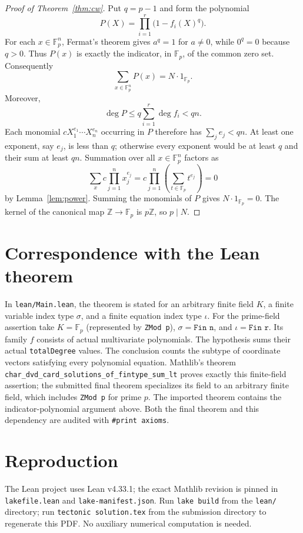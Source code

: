 \documentclass[11pt]{article}
\begin{document}
\begin{proof}[Proof of Theorem~\ref{thm:cw}]
Put $q=p-1$ and form the polynomial
\[
  P(X)=\prod_{i=1}^{r}\bigl(1-f_i(X)^q\bigr).
\]
For each $x\in\mathbb F_p^n$, Fermat's theorem gives $a^q=1$ for
$a\neq0$, while $0^q=0$ because $q>0$. Thus $P(x)$ is exactly the
indicator, in $\mathbb F_p$, of the common zero set. Consequently
\[
  \sum_{x\in\mathbb F_p^n}P(x)=N\cdot1_{\mathbb F_p}.
\]
Moreover,
\[
  \deg P\leq q\sum_{i=1}^{r}\deg f_i<qn.
\]
Each monomial $cX_1^{e_1}\cdots X_n^{e_n}$ occurring in $P$ therefore
has $\sum_j e_j<qn$. At least one exponent, say $e_j$, is less than $q$;
otherwise every exponent would be at least $q$ and their sum at least $qn$.
Summation over all $x\in\mathbb F_p^n$ factors as
\[
  \sum_x c\prod_{j=1}^{n}x_j^{e_j}
  =c\prod_{j=1}^{n}\left(\sum_{t\in\mathbb F_p}t^{e_j}\right)=0
\]
by Lemma~\ref{lem:power}. Summing the monomials of $P$ gives
$N\cdot1_{\mathbb F_p}=0$. The kernel of the canonical map
$\mathbb Z\to\mathbb F_p$ is $p\mathbb Z$, so $p\mid N$.
\end{proof}

\section*{Correspondence with the Lean theorem}
In \texttt{lean/Main.lean}, the theorem is stated for an arbitrary finite
field $K$, a finite variable index type $\sigma$, and a finite equation
index type $\iota$. For the prime-field assertion take $K=\mathbb F_p$
(represented by \texttt{ZMod p}), $\sigma=\texttt{Fin n}$, and
$\iota=\texttt{Fin r}$. Its family $f$ consists of actual multivariate
polynomials. The hypothesis sums their actual \texttt{totalDegree} values.
The conclusion counts the subtype of coordinate vectors satisfying every
polynomial equation. Mathlib's theorem
\texttt{char\_dvd\_card\_solutions\_of\_fintype\_sum\_lt} proves exactly
this finite-field assertion; the submitted final theorem specializes its
field to an arbitrary finite field, which includes \texttt{ZMod p} for
prime $p$. The imported theorem contains the indicator-polynomial argument
above. Both the final theorem and this
dependency are audited with \texttt{\#print axioms}.

\section*{Reproduction}
The Lean project uses Lean v4.33.1; the exact Mathlib revision is pinned in
\texttt{lakefile.lean} and \texttt{lake-manifest.json}. Run
\texttt{lake build} from the \texttt{lean/} directory; run
\texttt{tectonic solution.tex} from the submission
directory to regenerate this PDF. No auxiliary numerical computation is
needed.
\end{document}
